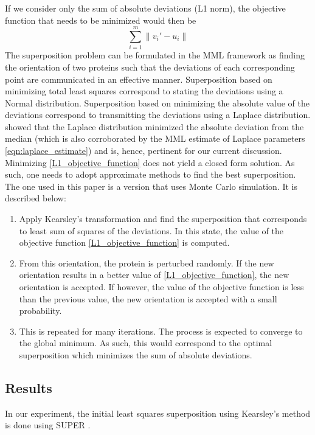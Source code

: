 \documentclass[wcp]{jmlr}
\begin{document}
If we consider only the sum of absolute deviations (L1 norm), the objective function 
that needs to be minimized would then be
\begin{equation} 
  \sum_{i=1}^m \|v_i'-u_i\| \label{L1_objective_function}
\end{equation}
The superposition problem can be formulated in the MML framework as finding the 
orientation of two proteins such that the deviations of each corresponding point
are communicated in an effective manner. Superposition based on minimizing total least
squares correspond to stating the deviations using a Normal distribution. 
Superposition based on minimizing the absolute value of the deviations correspond
to transmitting the deviations using a Laplace distribution. \citet{keynes-laplace} 
showed that the Laplace distribution minimized the absolute deviation from the median
(which is also corroborated by the MML estimate of Laplace parameters 
\eqref{eqn:laplace_estimate}) and is, hence, pertinent for our current discussion. \\

Minimizing \eqref{L1_objective_function} does not yield a closed form solution. As such,
one needs to adopt approximate methods to find the best superposition. The one used in
this paper is a version that uses Monte Carlo simulation. It is described below:
\begin{enumerate}
\item Apply Kearsley's transformation and find the superposition that corresponds
to least sum of squares of the deviations. In this state, the value of the 
objective function \eqref{L1_objective_function} is computed. 
\item From this orientation, the protein is perturbed randomly. If the new orientation
results in a better value of \eqref{L1_objective_function}, the new orientation is
accepted. If however, the value of the objective function is less than the previous
value, the new orientation is accepted with a small probability.
\item This is repeated for many iterations. The process is expected to converge to
the global minimum. As such, this would correspond to the optimal
superposition which minimizes the sum of absolute deviations.
\end{enumerate}

\subsection*{Results}
In our experiment, the initial least squares superposition using Kearsley's method
is done using SUPER \citep{super}.
\end{document}
